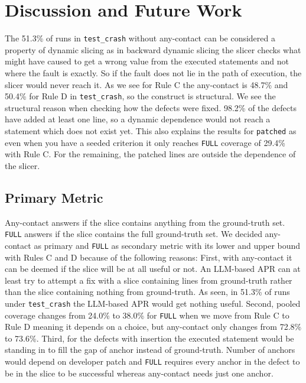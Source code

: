 \documentclass[sigconf,nonacm]{acmart}
\begin{document}
\section{Discussion and Future Work}
The 51.3\% of runs in \texttt{test\_crash} without any-contact can be considered a property of dynamic slicing as in backward dynamic slicing the slicer checks what might have caused to get a wrong value from the executed statements and not where the fault is exactly. So if the fault does not lie in the path of execution, the slicer would never reach it. As we see for Rule C the any-contact is 48.7\% and 50.4\% for Rule D in \texttt{test\_crash}, so the construct is structural. We see the structural reason when checking how the defects were fixed. 98.2\% of the defects have added at least one line, so a dynamic dependence would not reach a statement which does not exist yet. This also explains the results for \texttt{patched} as even when you have a seeded criterion it only reaches \texttt{FULL} coverage of 29.4\% with Rule C. For the remaining, the patched lines are outside the dependence of the slicer.

\subsection{Primary Metric}
Any-contact answers if the slice contains anything from the ground-truth set. \texttt{FULL} answers if the slice contains the full ground-truth set. We decided any-contact as primary and \texttt{FULL} as secondary metric with its lower and upper bound with Rules C and D because of the following reasons:
First, with any-contact it can be deemed if the slice will be at all useful or not. An LLM-based APR can at least try to attempt a fix with a slice containing lines from ground-truth rather than the slice containing nothing from ground-truth. As seen, in 51.3\% of runs under \texttt{test\_crash} the LLM-based APR would get nothing useful.
Second, pooled coverage changes from 24.0\% to 38.0\% for \texttt{FULL} when we move from Rule C to Rule D meaning it depends on a choice, but any-contact only changes from 72.8\% to 73.6\%.
Third, for the defects with insertion the executed statement would be standing in to fill the gap of anchor instead of ground-truth. Number of anchors would depend on developer patch and \texttt{FULL} requires every anchor in the defect to be in the slice to be successful whereas any-contact needs just one anchor.
\end{document}
